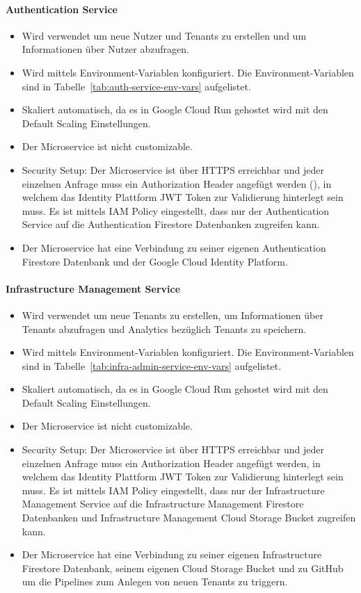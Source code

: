 \paragraph{Authentication Service}
\label{sec:auth-service}
\begin{itemize}
	\item Wird verwendet um neue Nutzer und Tenants zu erstellen und um Informationen über Nutzer abzufragen.
	\item Wird mittels Environment-Variablen konfiguriert. Die Environment-Variablen sind in Tabelle~\ref{tab:auth-service-env-vars} aufgelistet.
	\item Skaliert automatisch, da es in Google Cloud Run gehostet wird mit den Default Scaling Einstellungen.
	\item Der Microservice ist nicht customizable.
	\item Security Setup: Der Microservice ist über HTTPS erreichbar und jeder einzelnen Anfrage muss ein Authorization Header angefügt werden (), in welchem das Identity Plattform JWT Token zur Validierung hinterlegt sein muss. Es ist mittels IAM Policy eingestellt, dass nur der Authentication Service auf die Authentication Firestore Datenbanken zugreifen kann.
	\item Der Microservice hat eine Verbindung zu seiner eigenen Authentication Firestore Datenbank und der Google Cloud Identity Platform.
\end{itemize}

\paragraph{Infrastructure Management Service}
\begin{itemize}
	\item Wird verwendet um neue Tenants zu erstellen, um Informationen über Tenants abzufragen und Analytics bezüglich Tenants zu speichern.
	\item Wird mittels Environment-Variablen konfiguriert. Die Environment-Variablen sind in Tabelle~\ref{tab:infra-admin-service-env-vars} aufgelistet.
	\item Skaliert automatisch, da es in Google Cloud Run gehostet wird mit den Default Scaling Einstellungen.
	\item Der Microservice ist nicht customizable.
	\item Security Setup: Der Microservice ist über HTTPS erreichbar und jeder einzelnen Anfrage muss ein Authorization Header angefügt werden, in welchem das Identity Plattform JWT Token zur Validierung hinterlegt sein muss. Es ist mittels IAM Policy eingestellt, dass nur der Infrastructure Management Service auf die Infrastructure Management Firestore Datenbanken und Infrastructure Management Cloud Storage Bucket zugreifen kann.
	\item Der Microservice hat eine Verbindung zu seiner eigenen Infrastructure Firestore Datenbank, seinem eigenen Cloud Storage Bucket und zu GitHub um die Pipelines zum Anlegen von neuen Tenants zu triggern.
\end{itemize}

